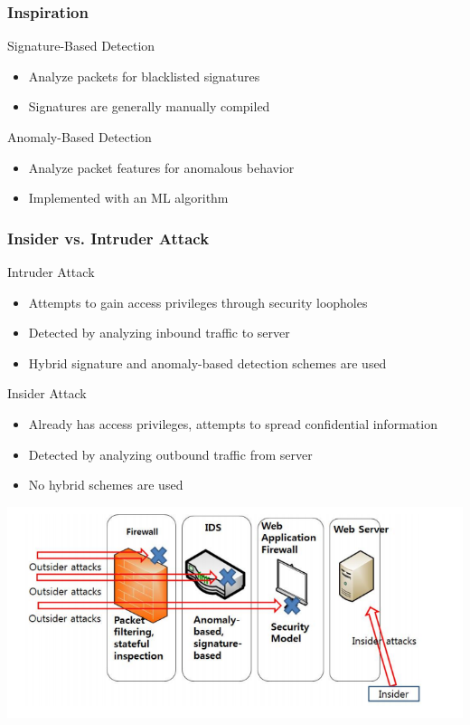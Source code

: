 \documentclass[10pt,mathserif]{beamer}
\begin{document}
\begin{frame}
  \frametitle{Inspiration}
  \begin{block}{Signature-Based Detection}
    \begin{itemize}
    \item Analyze packets for blacklisted signatures
    \item Signatures are generally manually compiled
    \end{itemize}
  \end{block}
  \begin{block}{Anomaly-Based Detection}
    \begin{itemize}
    \item Analyze packet features for anomalous behavior
    \item Implemented with an ML algorithm
    \end{itemize}
  \end{block}
\end{frame}
\begin{frame}
  \frametitle{Insider vs. Intruder Attack}
  \begin{block}{Intruder Attack}
    \begin{itemize}
    \item Attempts to gain access privileges through security loopholes
    \item Detected by analyzing inbound traffic to server
    \item Hybrid signature and anomaly-based detection schemes are used
    \end{itemize}
  \end{block}
  \begin{block}{Insider Attack}
    \begin{itemize}
    \item Already has access privileges, attempts to spread confidential information
    \item Detected by analyzing outbound traffic from server
    \item No hybrid schemes are used
    \end{itemize}
  \end{block}
  \includegraphics[width=\textwidth,natwidth=725,natheight=336]{figures/insider_vs_outsider.png}
\end{frame}
\end{document}
